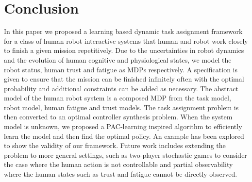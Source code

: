 \documentclass[journal]{IEEEtran}
\begin{document}
%
%

	\section{Conclusion}
	\label{sec: conclusion}
	In this paper we proposed a learning based dynamic task assignment framework for a class of human robot interactive systems that human and robot work closely to finish a given mission repetitively. Due to the uncertainties in robot dynamics and the evolution of human cognitive and physiological states, we model the robot status, human trust and fatigue as MDPs respectively. A specification is given to ensure that the mission can be finished infinitely often with the optimal probability and additional constraints can be added as necessary. The abstract model of the human robot system is a composed MDP from the task model, robot model, human fatigue and trust models. The task assignment problem is then converted to an optimal controller synthesis problem. When the system model is unknown, we proposed a PAC-learning inspired algorithm to efficiently learn the model and then find the optimal policy. An example has been explored to show the validity of our framework. Future work includes extending the problem to more general settings, such as two-player stochastic games to consider the case where the human action is not controllable and partial observability where the human states such as trust and fatigue cannot be directly observed. 
	
\end{document}
